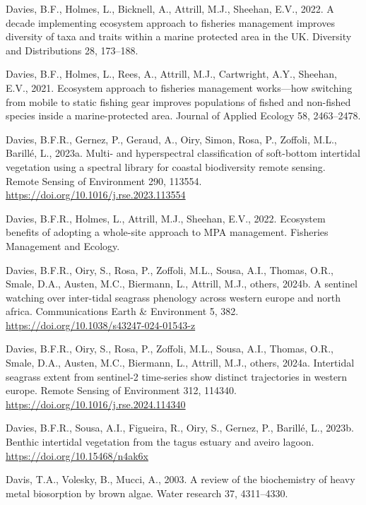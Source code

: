\documentclass[
  letterpaper,
  11pt,
  english,
  singlespacing,
  headsepline]{MastersDoctoralThesis}
\newlength{\cslhangindent}
\newenvironment{CSLReferences}[2] %
 {\begin{list}{}{%
  \setlength{\itemindent}{0pt}
  \setlength{\leftmargin}{0pt}
  \setlength{\parsep}{0pt}
  \ifodd #1
   \setlength{\leftmargin}{\cslhangindent}
   \setlength{\itemindent}{-1\cslhangindent}
  \fi
  \setlength{\itemsep}{#2\baselineskip}}}
 {\end{list}}
\begin{document}
\begin{CSLReferences}{1}{0}
Davies, B.F., Holmes, L., Bicknell, A., Attrill, M.J., Sheehan, E.V.,
2022. A decade implementing ecosystem approach to fisheries management
improves diversity of taxa and traits within a marine protected area in
the UK. Diversity and Distributions 28, 173--188.

Davies, B.F., Holmes, L., Rees, A., Attrill, M.J., Cartwright, A.Y.,
Sheehan, E.V., 2021. Ecosystem approach to fisheries management
works---how switching from mobile to static fishing gear improves
populations of fished and non-fished species inside a marine-protected
area. Journal of Applied Ecology 58, 2463--2478.

Davies, B.F.R., Gernez, P., Geraud, A., Oiry, Simon, Rosa, P., Zoffoli,
M.L., Barillé, L., 2023a. Multi- and hyperspectral classification of
soft-bottom intertidal vegetation using a spectral library for coastal
biodiversity remote sensing. Remote Sensing of Environment 290, 113554.
\url{https://doi.org/10.1016/j.rse.2023.113554}

Davies, B.F.R., Holmes, L., Attrill, M.J., Sheehan, E.V., 2022.
Ecosystem benefits of adopting a whole-site approach to MPA management.
Fisheries Management and Ecology.

Davies, B.F.R., Oiry, S., Rosa, P., Zoffoli, M.L., Sousa, A.I., Thomas,
O.R., Smale, D.A., Austen, M.C., Biermann, L., Attrill, M.J., others,
2024b. A sentinel watching over inter-tidal seagrass phenology across
western europe and north africa. Communications Earth \& Environment 5,
382. \url{https://doi.org/10.1038/s43247-024-01543-z}

Davies, B.F.R., Oiry, S., Rosa, P., Zoffoli, M.L., Sousa, A.I., Thomas,
O.R., Smale, D.A., Austen, M.C., Biermann, L., Attrill, M.J., others,
2024a. Intertidal seagrass extent from sentinel-2 time-series show
distinct trajectories in western europe. Remote Sensing of Environment
312, 114340. \url{https://doi.org/10.1016/j.rse.2024.114340}

Davies, B.F.R., Sousa, A.I., Figueira, R., Oiry, S., Gernez, P.,
Barillé, L., 2023b. Benthic intertidal vegetation from the tagus estuary
and aveiro lagoon. \url{https://doi.org/10.15468/n4ak6x}

Davis, T.A., Volesky, B., Mucci, A., 2003. A review of the biochemistry
of heavy metal biosorption by brown algae. Water research 37,
4311--4330.


\end{CSLReferences}
\end{document}
